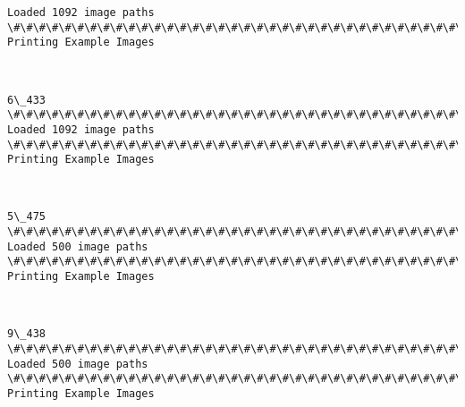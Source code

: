 \documentclass[11pt]{article}
\begin{document}
    \begin{Verbatim}[commandchars=\\\{\}]
Loaded 1092 image paths
\#\#\#\#\#\#\#\#\#\#\#\#\#\#\#\#\#\#\#\#\#\#\#\#\#\#\#\#\#\#\#\#\#\#\#\#\#\#\#\#\#\#
Printing Example Images

\end{Verbatim}

    \begin{center}
    \end{center}
    { \hspace*{\fill} \\}
    
    \begin{Verbatim}[commandchars=\\\{\}]
6\_433
\#\#\#\#\#\#\#\#\#\#\#\#\#\#\#\#\#\#\#\#\#\#\#\#\#\#\#\#\#\#\#\#\#\#\#\#\#\#\#\#\#\#
Loaded 1092 image paths
\#\#\#\#\#\#\#\#\#\#\#\#\#\#\#\#\#\#\#\#\#\#\#\#\#\#\#\#\#\#\#\#\#\#\#\#\#\#\#\#\#\#
Printing Example Images

\end{Verbatim}

    \begin{center}
    \end{center}
    { \hspace*{\fill} \\}
    
    \begin{Verbatim}[commandchars=\\\{\}]
5\_475
\#\#\#\#\#\#\#\#\#\#\#\#\#\#\#\#\#\#\#\#\#\#\#\#\#\#\#\#\#\#\#\#\#\#\#\#\#\#\#\#\#\#
Loaded 500 image paths
\#\#\#\#\#\#\#\#\#\#\#\#\#\#\#\#\#\#\#\#\#\#\#\#\#\#\#\#\#\#\#\#\#\#\#\#\#\#\#\#\#\#
Printing Example Images

\end{Verbatim}

    \begin{center}
    \end{center}
    { \hspace*{\fill} \\}
    
    \begin{Verbatim}[commandchars=\\\{\}]
9\_438
\#\#\#\#\#\#\#\#\#\#\#\#\#\#\#\#\#\#\#\#\#\#\#\#\#\#\#\#\#\#\#\#\#\#\#\#\#\#\#\#\#\#
Loaded 500 image paths
\#\#\#\#\#\#\#\#\#\#\#\#\#\#\#\#\#\#\#\#\#\#\#\#\#\#\#\#\#\#\#\#\#\#\#\#\#\#\#\#\#\#
Printing Example Images

\end{Verbatim}
\end{document}
